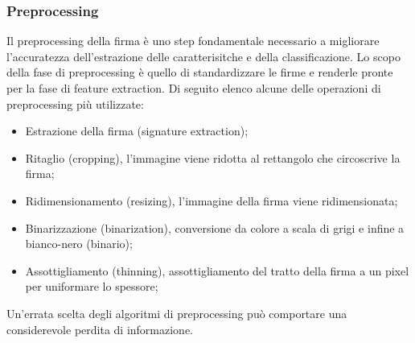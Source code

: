 \subsubsection*{Preprocessing}
\label{2.1.3.1}
Il preprocessing della firma è uno step fondamentale necessario a migliorare l'accuratezza dell'estrazione delle caratterisitche e della classificazione. Lo scopo della fase di preprocessing è quello di standardizzare le firme e renderle pronte per la fase di feature extraction. Di seguito elenco alcune delle operazioni di preprocessing più utilizzate:
\begin{itemize}
\item Estrazione della firma (signature extraction);
\item Ritaglio (cropping), l'immagine viene ridotta al rettangolo che circoscrive la firma;
\item Ridimensionamento (resizing), l'immagine della firma viene ridimensionata;
\item Binarizzazione (binarization), conversione da colore a scala di grigi e infine a bianco-nero (binario);
\item Assottigliamento (thinning), assottigliamento del tratto della firma a un pixel per uniformare lo spessore;
\end{itemize}
Un'errata scelta degli algoritmi di preprocessing può comportare una considerevole perdita di informazione.

